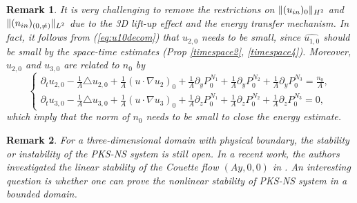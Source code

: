 \documentclass[12pt, reqno]{amsart}
\newtheorem{remark}{Remark}[section]
\numberwithin{equation}{section}
\begin{document}
\begin{remark}
It is very challenging to remove the restrictions on 
$\|(u_{\rm in})_{0}\|_{H^2}$ and  $\|(n_{\rm in})_{(0,\neq)}\|_{L^2}$ due to \textcolor[rgb]{,0,0}{the 3D lift-up effect} and the energy transfer mechanism. 
In fact, it follows from (\ref{eq:u10decom}) that $u_{2,0}$ needs to be small, since $\widehat{u_{1,0}}$ should be small by the space-time estimates (Prop \ref{timespace2}, \ref{timespace4}). 
	\textcolor[rgb]{0,0,0}{
		Moreover, $u_{2,0}$ and 
		$u_{3,0}$ are related to $n_{0}$ by}
	\begin{equation*}
		\left\{
		\begin{array}{lr}
			\partial_tu_{2,0}-\frac{1}{A}\triangle u_{2,0}
			+\frac{1}{A}(u\cdot\nabla u_{2})_0
			+\frac{1}{A}\partial_yP^{N_1}_0
			+\frac{1}{A}\partial_y P^{N_2}_0+\frac{1}{A}\partial_y P^{N_3}_0=\frac{n_0}{A}, \\
			\partial_tu_{3,0}-\frac{1}{A}\triangle u_{3,0}
			+\frac{1}{A}(u\cdot\nabla u_3)_0
			+\frac{1}{A}\partial_zP^{N_1}_0
			+\frac{1}{A}\partial_z P^{N_2}_0
			+\frac{1}{A}\partial_z P^{N_3}_0=0,
		\end{array}
		\right.
	\end{equation*}	
	which imply that the norm of  $n_0$ needs to be small to close the energy estimate. 
\end{remark}


\begin{remark}
	For a three-dimensional domain with physical boundary, the stability or instability of the PKS-NS system is still open. In a recent work, the authors investigated the linear stability of the Couette flow $(Ay,0,0)$ in \cite{CWW1}. 
	An interesting question is whether one can prove the nonlinear stability of PKS-NS system in a bounded domain.
\end{remark}
\end{document}
